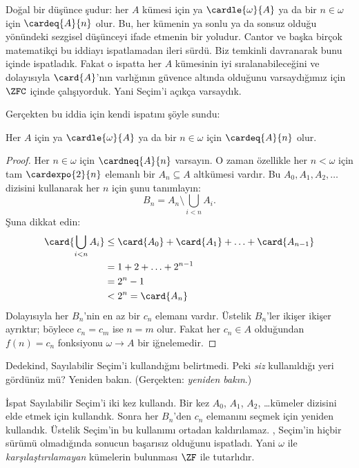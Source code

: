 \begin{ex}
Doğal bir düşünce şudur: her $A$ kümesi için ya $\cardle{\omega}{A}$ ya
da bir $n\in\omega$ için $\cardeq{A}{n}$ olur. Bu, her kümenin ya sonlu
ya da sonsuz olduğu yönündeki sezgisel düşünceyi ifade etmenin bir yoludur.
Cantor ve başka birçok matematikçi bu iddiayı ispatlamadan ileri sürdü.
Biz temkinli davranarak bunu
 içinde ispatladık.
Fakat o ispatta her $A$ kümesinin iyi sıralanabileceğini ve dolayısıyla
$\card{A}$'nın varlığının güvence altında olduğunu varsaydığımız için
$\ZFC$ içinde çalışıyorduk. Yani Seçim'i açıkça varsaydık.

Gerçekten \citet{Dedekind1888} bu iddia için kendi ispatını şöyle sundu:

\begin{thm}
Her $A$ için ya $\cardle{\omega}{A}$ ya da bir $n\in\omega$ için
$\cardeq{A}{n}$ olur.
\end{thm}

\begin{proof}
Her $n\in\omega$ için $\cardneq{A}{n}$ varsayın. O zaman özellikle her
$n<\omega$ için tam $\cardexpo{2}{n}$ elemanlı bir
$A_n\subseteq A$ altkümesi vardır. Bu $A_0,A_1,A_2,\ldots$ dizisini
kullanarak her $n$ için şunu tanımlayın:
\[
	B_n = A_n \setminus \bigcup_{i < n} A_i.
\]
Şuna dikkat edin:
\begin{align*}
	\card{\bigcup_{i < n}A_i}
	&\leq \card{A_0} + \card{A_1} + \ldots + \card{A_{n-1}}\\
	&=1 + 2 + \ldots + 2^{n-1}\\
	& = 2^n - 1\\
	& < 2^n = \card{A_n}
\end{align*}
Dolayısıyla her $B_n$'nin en az bir $c_n$ elemanı vardır. Üstelik
$B_n$'ler ikişer ikişer ayrıktır; böylece $c_n=c_m$ ise $n=m$ olur.
Fakat her $c_n\in A$ olduğundan $f(n)=c_n$ fonksiyonu
$\omega\to A$ bir iğnelemedir.
\end{proof}
\noindent
Dedekind, Sayılabilir Seçim'i kullandığını belirtmedi. Peki
\emph{siz} kullanıldığı yeri gördünüz mü? Yeniden bakın. (Gerçekten:
\emph{yeniden bakın}.)

İspat Sayılabilir Seçim'i iki kez kullandı. Bir kez
$A_0$, $A_1$, $A_2$, \dots\@ kümeler dizisini elde etmek için kullandık. Sonra her
$B_n$'den $c_n$ elemanını seçmek için yeniden kullandık. Üstelik Seçim'in
bu kullanımı ortadan kaldırılamaz. \citet[p.~138]{Cohen1966}, Seçim'in
hiçbir sürümü olmadığında sonucun başarısız olduğunu ispatladı. Yani
$\omega$ ile \emph{karşılaştırılamayan} kümelerin bulunması $\ZF$ ile
tutarlıdır.
\end{ex}

